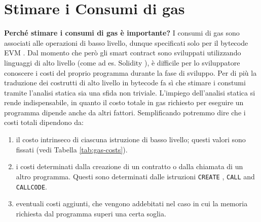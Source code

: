 \section{Stimare i Consumi di gas}


	\textbf{Perché stimare i consumi di gas è importante?}\newline
    \newline
	\indent I consumi di gas sono associati alle operazioni di basso livello, 
	dunque specificati solo per il bytecode EVM \cite{wood2014ethereum}. Dal momento che però gli
	smart contract sono sviluppati utilizzando linguaggi di alto livello (come
	ad es. Solidity \cite{ethereum/solidity_2019}), è difficile per lo sviluppatore conoscere i 
	costi del proprio programma durante la fase di sviluppo. Per di più la traduzione 
	dei costrutti di alto livello in bytecode fa sì che stimare i constumi tramite l'analisi 
	statica sia una sfida non triviale. L'impiego dell'analisi statica si rende indispensabile, in quanto il costo totale in gas richiesto per eseguire un programma dipende anche da altri fattori.\newline
	\indent Semplificando potremmo dire che i costi totali dipendono da:
	\begin{enumerate}
	\item il costo intrinseco di ciascuna istruzione di basso livello; questi valori sono fissati (vedi Tabella \ref{tab:gas-costs}).
	\item i costi determinati dalla creazione di un contratto o dalla chiamata di un altro programma. Questi sono determinati dalle istruzioni \texttt{CREATE} , \texttt{CALL} and \texttt{CALLCODE}.
	\item eventuali costi aggiunti, che vengono addebitati nel caso in cui la memoria richiesta dal programma superi una certa soglia.
	\end{enumerate}

